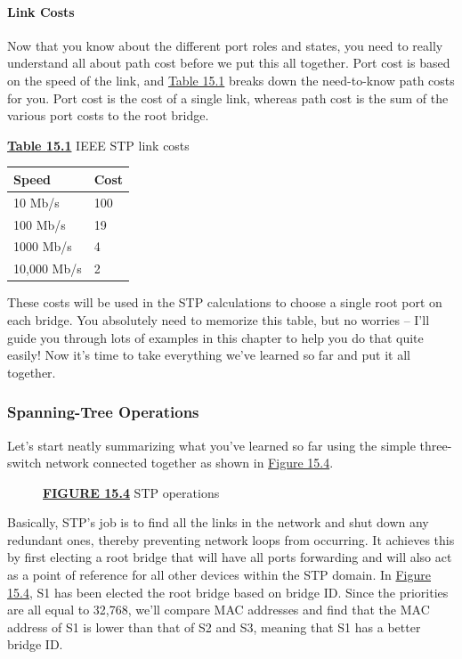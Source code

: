 \documentclass[b5paper,11pt]{memoir}
\begin{document}
\paragraph{Link Costs}

Now that you know about the different port roles and states, you need to
really understand all about path cost before we put this all together.
Port cost is based on the speed of the link, and
\protect\hyperlink{c15.xhtmlux5cux23table15-1}{Table 15.1} breaks down
the need-to-know path costs for you. Port cost is the cost of a single
link, whereas path cost is the sum of the various port costs to the root
bridge.



{\protect\hyperlink{c15.xhtmlux5cux23tableanchor15-1}{\textbf{Table
15.1}} IEEE STP link costs}

\begin{longtable}[]{@{}ll@{}}
\toprule
Speed & Cost\tabularnewline
\midrule
\endhead
10 Mb/s & 100\tabularnewline
100 Mb/s & 19\tabularnewline
1000 Mb/s & 4\tabularnewline
10,000 Mb/s & 2\tabularnewline
\bottomrule
\end{longtable}

These costs will be used in the STP calculations to choose a single root
port on each bridge. You absolutely need to memorize this table, but no
worries -- I'll guide you through lots of examples in this chapter to
help you do that quite easily! Now it's time to take everything we've
learned so far and put it all together.

\subsubsection[Spanning-Tree
Operations]{\texorpdfstring{\protect\hypertarget{c15.xhtmlux5cux23c15-sec-11}{}{}Spanning-Tree
Operations}{Spanning-Tree Operations}}

Let's start neatly summarizing what you've learned so far using the
simple three-switch network connected together as shown in
\protect\hyperlink{c15.xhtmlux5cux23figure15-4}{Figure 15.4}.

\begin{figure}
\centering
\caption{{\protect\hyperlink{c15.xhtmlux5cux23figureanchor15-4}{\textbf{FIGURE
15.4}} STP operations}}
\end{figure}

Basically, STP's job is to find all the links in the network and shut
down any redundant ones, thereby preventing network loops from
occurring. It achieves this by first electing a root bridge that will
have all ports forwarding and will also act as a point of reference for
all other devices within the STP domain. In
\protect\hyperlink{c15.xhtmlux5cux23figure15-4}{Figure 15.4}, S1 has
been elected the root
bridge based on
bridge ID. Since the priorities are all equal to 32,768, we'll compare
MAC addresses and find that the MAC address of S1 is lower than that of
S2 and S3, meaning that S1 has a better bridge ID.
\end{document}
